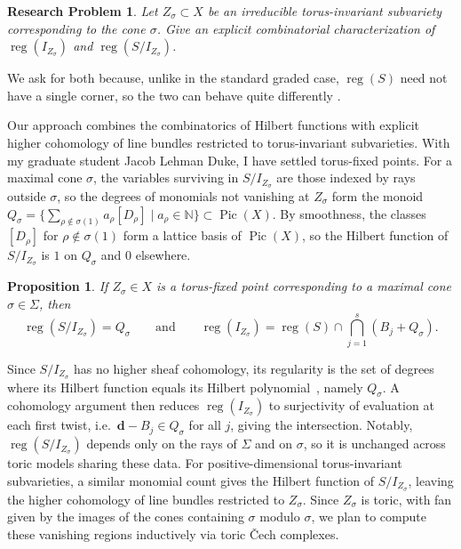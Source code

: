 \documentclass[11pt,reqno]{amsart}
\newtheorem{problem}[lemma]{Research Problem}
\newtheorem{prop}[lemma]{Proposition}
\theoremstyle{remark}
\newcommand{\reg}{\operatorname{reg}}
\newcommand{\Pic}{\operatorname{Pic}}
\newcommand{\dd}{\mathbf{d}}
\newcommand{\NN}{\mathbb{N}}
\begin{document}
\begin{problem}\label{prob:torus-invariant-mg}
	Let $Z_{\sigma} \subset X$ be an irreducible torus-invariant subvariety corresponding to the cone $\sigma$. Give an explicit combinatorial characterization of $\reg(I_{Z_\sigma})$ and $\reg(S/I_{Z_\sigma})$. 
\end{problem}

We ask for both because, unlike in the standard graded case, $\reg(S)$ need not have a single corner, so the two can behave quite differently \cite{bruceHellerSayrafi22}.

Our approach combines the combinatorics of Hilbert functions with explicit higher cohomology of line bundles restricted to torus-invariant subvarieties. With my graduate student Jacob Lehman Duke, I have settled torus-fixed points. For a maximal cone $\sigma$, the variables surviving in $S/I_{Z_\sigma}$ are those indexed by rays outside $\sigma$, so the degrees of monomials not vanishing at $Z_\sigma$ form the monoid $Q_\sigma=\{\sum_{\rho\notin\sigma(1)}a_\rho[D_\rho]\mid a_\rho\in\NN\}\subset\Pic(X)$. By smoothness, the classes $[D_\rho]$ for $\rho\notin\sigma(1)$ form a lattice basis of $\Pic(X)$, so the Hilbert function of $S/I_{Z_\sigma}$ is $1$ on $Q_\sigma$ and $0$ elsewhere.

\begin{prop}
	If $Z_{\sigma} \in X$ is a torus-fixed point corresponding to a maximal cone $\sigma \in \Sigma$, then 
	\[
		\reg\left(S/I_{Z_\sigma}\right) = Q_{\sigma} \quad \quad \text{and} \quad \quad  \reg\left(I_{Z_\sigma}\right) = \reg\left(S \right) \cap \bigcap_{j=1}^{s} \left(B_{j}+Q_{\sigma}\right).
	\]
\end{prop}

Since $S/I_{Z_{\sigma}}$ has no higher sheaf cohomology, its regularity is the set of degrees where its Hilbert function equals its Hilbert polynomial~\cite[Proposition~6.4]{maclaganSmith04}, namely $Q_\sigma$. A cohomology argument then reduces $\reg(I_{Z_\sigma})$ to surjectivity of evaluation at each first twist, i.e.\ $\dd-B_j\in Q_\sigma$ for all $j$, giving the intersection. Notably, $\reg(S/I_{Z_\sigma})$ depends only on the rays of $\Sigma$ and on $\sigma$, so it is unchanged across toric models sharing these data. For positive-dimensional torus-invariant subvarieties, a similar monomial count gives the Hilbert function of $S/I_{Z_\sigma}$, leaving the higher cohomology of line bundles restricted to $Z_\sigma$. Since $Z_\sigma$ is toric, with fan given by the images of the cones containing $\sigma$ modulo $\sigma$, we plan to compute these vanishing regions inductively via toric \v{C}ech complexes.
\end{document}
